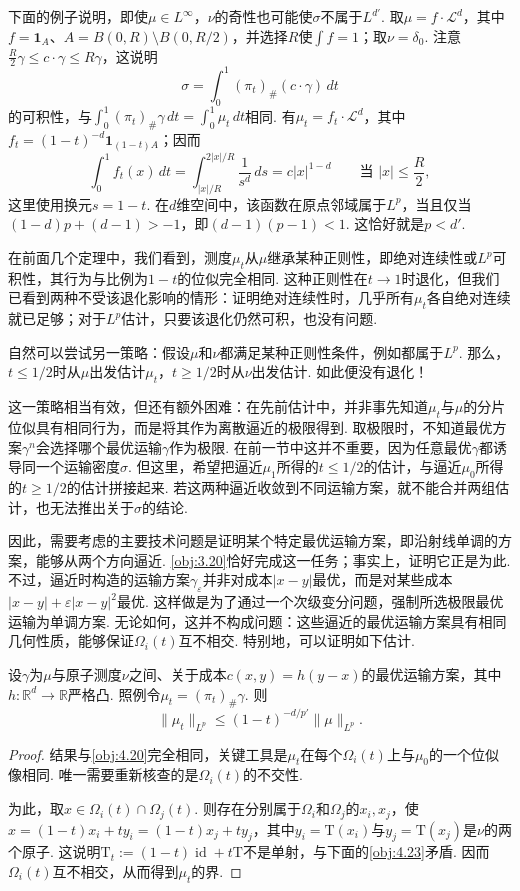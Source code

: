 \begin{example}\label{obj:4.21}
下面的例子说明，即使$\mu\in L^\infty$，$\nu$的奇性也可能使$\sigma$不属于$L^{d'}$. 取$\mu=f\cdot\mathscr L^d$，其中$f=\mathbf1_A$、$A=B(0,R)\setminus B(0,R/2)$，并选择$R$使$\int f=1$；取$\nu=\delta_0$. 注意$\frac R2\gamma\leq c\cdot\gamma\leq R\gamma$，这说明
\[
\sigma=\int_0^1(\pi_t)_\#(c\cdot\gamma)\,dt
\]
的可积性，与$\int_0^1(\pi_t)_\#\gamma\,dt=\int_0^1\mu_t\,dt$相同. 有$\mu_t=f_t\cdot\mathscr L^d$，其中$f_t=(1-t)^{-d}\mathbf1_{(1-t)A}$；因而
\[
\int_0^1f_t(x)\,dt=\int_{|x|/R}^{2|x|/R}\frac1{s^d}\,ds
=c|x|^{1-d}\qquad\text{当 }|x|\leq\frac R2,
\]
这里使用换元$s=1-t$. 在$d$维空间中，该函数在原点邻域属于$L^p$，当且仅当$(1-d)p+(d-1)>-1$，即$(d-1)(p-1)<1$. 这恰好就是$p<d'$.
\end{example}

在前面几个定理中，我们看到，测度$\mu_t$从$\mu$继承某种正则性，即绝对连续性或$L^p$可积性，其行为与比例为$1-t$的位似完全相同. 这种正则性在$t\to1$时退化，但我们已看到两种不受该退化影响的情形：证明绝对连续性时，几乎所有$\mu_t$各自绝对连续就已足够；对于$L^p$估计，只要该退化仍然可积，也没有问题.

自然可以尝试另一策略：假设$\mu$和$\nu$都满足某种正则性条件，例如都属于$L^p$. 那么，$t\leq1/2$时从$\mu$出发估计$\mu_t$，$t\geq1/2$时从$\nu$出发估计. 如此便没有退化！

这一策略相当有效，但还有额外困难：在先前估计中，并非事先知道$\mu_t$与$\mu$的分片位似具有相同行为，而是将其作为离散逼近的极限得到. 取极限时，不知道最优方案$\gamma^n$会选择哪个最优运输$\gamma$作为极限. 在前一节中这并不重要，因为任意最优$\gamma$都诱导同一个运输密度$\sigma$. 但这里，希望把逼近$\mu_1$所得的$t\leq1/2$的估计，与逼近$\mu_0$所得的$t\geq1/2$的估计拼接起来. 若这两种逼近收敛到不同运输方案，就不能合并两组估计，也无法推出关于$\sigma$的结论.

因此，需要考虑的主要技术问题是证明某个特定最优运输方案，即沿射线单调的方案，能够从两个方向逼近. \autoref{obj:3.20}恰好完成这一任务；事实上，\cite{b273}证明它正是为此. 不过，逼近时构造的运输方案$\gamma_\varepsilon$并非对成本$|x-y|$最优，而是对某些成本$|x-y|+\varepsilon|x-y|^2$最优. 这样做是为了通过一个次级变分问题，强制所选极限最优运输为单调方案. 无论如何，这并不构成问题：这些逼近的最优运输方案具有相同几何性质，能够保证$\Omega_i(t)$互不相交. 特别地，可以证明如下估计.

\begin{lemma}\label{obj:4.22}
设$\gamma$为$\mu$与原子测度$\nu$之间、关于成本$c(x,y)=h(y-x)$的最优运输方案，其中$h:\mathbb R^d\to\mathbb R$严格凸. 照例令$\mu_t=(\pi_t)_\#\gamma$. 则
\[
\|\mu_t\|_{L^p}\leq(1-t)^{-d/p'}\|\mu\|_{L^p}.
\]
\end{lemma}
\begin{proof}
结果与\autoref{obj:4.20}完全相同，关键工具是$\mu_t$在每个$\Omega_i(t)$上与$\mu_0$的一个位似像相同. 唯一需要重新核查的是$\Omega_i(t)$的不交性.

为此，取$x\in\Omega_i(t)\cap\Omega_j(t)$. 则存在分别属于$\Omega_i$和$\Omega_j$的$x_i,x_j$，使$x=(1-t)x_i+ty_i=(1-t)x_j+ty_j$，其中$y_i=\mathrm T(x_i)$与$y_j=\mathrm T(x_j)$是$\nu$的两个原子. 这说明$\mathrm T_t:=(1-t)\operatorname{id}+t\mathrm T$不是单射，与下面的\autoref{obj:4.23}矛盾. 因而$\Omega_i(t)$互不相交，从而得到$\mu_t$的界.
\end{proof}


